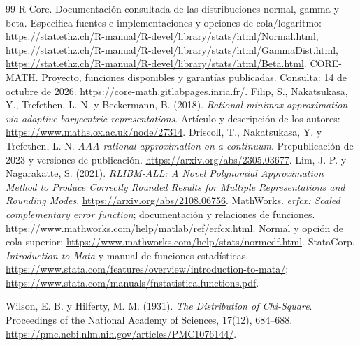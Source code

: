 \documentclass[11pt,a4paper]{article}
\theoremstyle{definition}
\begin{document}
\begin{thebibliography}{99}
 R Core. Documentación consultada de las distribuciones normal, gamma y beta. Especifica fuentes e implementaciones y opciones de cola/logaritmo: \url{https://stat.ethz.ch/R-manual/R-devel/library/stats/html/Normal.html}, \url{https://stat.ethz.ch/R-manual/R-devel/library/stats/html/GammaDist.html}, \url{https://stat.ethz.ch/R-manual/R-devel/library/stats/html/Beta.html}. CORE-MATH. Proyecto, funciones disponibles y garantías publicadas. Consulta: 14 de octubre de 2026. \url{https://core-math.gitlabpages.inria.fr/}.
 Filip, S., Nakatsukasa, Y., Trefethen, L. N. y Beckermann, B. (2018). \textit{Rational minimax approximation via adaptive barycentric representations}. Artículo y descripción de los autores: \url{https://www.maths.ox.ac.uk/node/27314}.
 Driscoll, T., Nakatsukasa, Y. y Trefethen, L. N. \textit{AAA rational approximation on a continuum}. Prepublicación de 2023 y versiones de publicación. \url{https://arxiv.org/abs/2305.03677}.
 Lim, J. P. y Nagarakatte, S. (2021). \textit{RLIBM-ALL: A Novel Polynomial Approximation Method to Produce Correctly Rounded Results for Multiple Representations and Rounding Modes}. \url{https://arxiv.org/abs/2108.06756}.
 MathWorks. \textit{erfcx: Scaled complementary error function}; documentación y relaciones de funciones. \url{https://www.mathworks.com/help/matlab/ref/erfcx.html}. Normal y opción de cola superior: \url{https://www.mathworks.com/help/stats/normcdf.html}.
 StataCorp. \textit{Introduction to Mata} y manual de funciones estadísticas. \url{https://www.stata.com/features/overview/introduction-to-mata/}; \url{https://www.stata.com/manuals/fnstatisticalfunctions.pdf}.


 Wilson, E. B. y Hilferty, M. M. (1931). \textit{The Distribution of Chi-Square}. Proceedings of the National Academy of Sciences, 17(12), 684--688. \url{https://pmc.ncbi.nlm.nih.gov/articles/PMC1076144/}.
\end{thebibliography}
\endgroup
\end{document}
